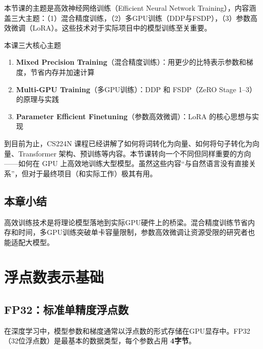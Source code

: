 \documentclass[a4paper]{article}
\begin{document}
本节课的主题是高效神经网络训练（Efficient Neural Network Training），内容涵盖三大主题：（1）混合精度训练，（2）多GPU训练（DDP与FSDP），（3）参数高效微调（LoRA）。这些技术对于实际项目中的模型训练至关重要。





\begin{importantbox}{本课三大核心主题}
\begin{enumerate}
    \item \textbf{Mixed Precision Training}（混合精度训练）：用更少的比特表示参数和梯度，节省内存并加速计算
    \item \textbf{Multi-GPU Training}（多GPU训练）：DDP 和 FSDP（ZeRO Stage 1--3）的原理与实践
    \item \textbf{Parameter Efficient Finetuning}（参数高效微调）：LoRA 的核心思想与实现
\end{enumerate}
\end{importantbox}

到目前为止，CS224N 课程已经讲解了如何将词转化为向量、如何将句子转化为向量、Transformer 架构、预训练等内容。本节课转向一个不同但同样重要的方向——如何在 GPU 上高效地训练大型模型。虽然这些内容``与自然语言没有直接关系''，但对于最终项目（和实际工作）极其有用。

\subsection{本章小结}

高效训练技术是将理论模型落地到实际GPU硬件上的桥梁。混合精度训练节省内存和时间，多GPU训练突破单卡容量限制，参数高效微调让资源受限的研究者也能适配大模型。


\section{浮点数表示基础}

\subsection{FP32：标准单精度浮点数}

在深度学习中，模型参数和梯度通常以浮点数的形式存储在GPU显存中。FP32（32位浮点数）是最基本的数据类型，每个参数占用 \textbf{4字节}。


\end{document}

